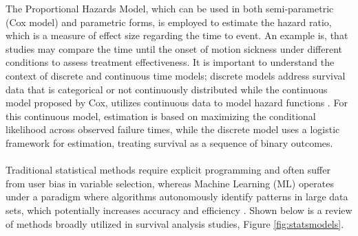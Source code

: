 \noindent The Proportional Hazards Model, which can be used in both semi-parametric (Cox model) and parametric forms, is employed to estimate the hazard ratio, which is a measure of effect size regarding the time to event. An example is, that studies may compare the time until the onset of motion sickness under different conditions to assess treatment effectiveness. It is important to understand the context of discrete and continuous time models; discrete models address survival data that is categorical or not continuously distributed while the continuous model proposed by Cox, utilizes continuous data to model hazard functions \parencite{kalbfleisch_fifty_2023}. For this continuous model, estimation is based on maximizing the conditional likelihood across observed failure times, while the discrete model uses a logistic framework for estimation, treating survival as a sequence of binary outcomes. 
\\\\
\noindent Traditional statistical methods require explicit programming and often suffer from user bias in variable selection, whereas Machine Learning (ML) operates under a paradigm where algorithms autonomously identify patterns in large data sets, which potentially increases accuracy and efficiency \parencite{polce_guide_2023}. Shown below is a review \parencite{smith_scoping_2022} of methods broadly utilized in survival analysis studies, Figure \ref{fig:statsmodels}.


